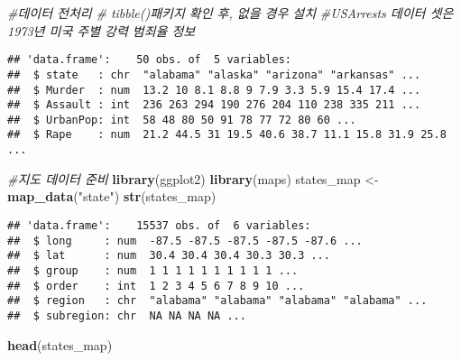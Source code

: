 \documentclass[]{article}
\newenvironment{Shaded}{\begin{snugshade}}{\end{snugshade}}
\newcommand{\CommentTok}[1]{\textcolor[rgb]{0.56,0.35,0.01}{\textit{#1}}}
\newcommand{\DataTypeTok}[1]{\textcolor[rgb]{0.13,0.29,0.53}{#1}}
\newcommand{\KeywordTok}[1]{\textcolor[rgb]{0.13,0.29,0.53}{\textbf{#1}}}
\newcommand{\NormalTok}[1]{#1}
\newcommand{\OperatorTok}[1]{\textcolor[rgb]{0.81,0.36,0.00}{\textbf{#1}}}
\newcommand{\StringTok}[1]{\textcolor[rgb]{0.31,0.60,0.02}{#1}}
\begin{document}
\begin{Shaded}
\begin{Highlighting}[]
\CommentTok{#데이터 전처리}
\CommentTok{# tibble()패키지 확인 후, 없을 경우 설치}
\CommentTok{#USArrests 데이터 셋은 1973년 미국 주별 강력 범죄율 정보}
\end{Highlighting}
\end{Shaded}

\begin{Shaded}
\end{Shaded}

\begin{verbatim}
## 'data.frame':    50 obs. of  5 variables:
##  $ state   : chr  "alabama" "alaska" "arizona" "arkansas" ...
##  $ Murder  : num  13.2 10 8.1 8.8 9 7.9 3.3 5.9 15.4 17.4 ...
##  $ Assault : int  236 263 294 190 276 204 110 238 335 211 ...
##  $ UrbanPop: int  58 48 80 50 91 78 77 72 80 60 ...
##  $ Rape    : num  21.2 44.5 31 19.5 40.6 38.7 11.1 15.8 31.9 25.8 ...
\end{verbatim}

\begin{Shaded}
\begin{Highlighting}[]
\CommentTok{#지도 데이터 준비}
\KeywordTok{library}\NormalTok{(ggplot2)}
\KeywordTok{library}\NormalTok{(maps)}
\NormalTok{states_map <-}\KeywordTok{map_data}\NormalTok{(}\StringTok{"state"}\NormalTok{)}
\KeywordTok{str}\NormalTok{(states_map)}
\end{Highlighting}
\end{Shaded}

\begin{verbatim}
## 'data.frame':    15537 obs. of  6 variables:
##  $ long     : num  -87.5 -87.5 -87.5 -87.5 -87.6 ...
##  $ lat      : num  30.4 30.4 30.4 30.3 30.3 ...
##  $ group    : num  1 1 1 1 1 1 1 1 1 1 ...
##  $ order    : int  1 2 3 4 5 6 7 8 9 10 ...
##  $ region   : chr  "alabama" "alabama" "alabama" "alabama" ...
##  $ subregion: chr  NA NA NA NA ...
\end{verbatim}

\begin{Shaded}
\begin{Highlighting}[]
\KeywordTok{head}\NormalTok{(states_map)}
\end{Highlighting}
\end{Shaded}
\end{document}
